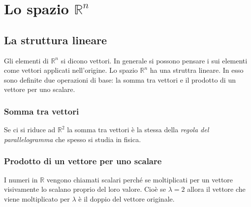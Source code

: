 \section{Lo spazio $\mathbb{R}^n$}
\subsection{La struttura lineare}
Gli elementi di $\mathbb{R}^n$ si dicono vettori. In generale si possono pensare i sui elementi come vettori applicati nell'origine. Lo spazio $\mathbb{R}^n$ ha una struttra lineare. In esso sono definite due operazioni di base: la somma tra vettori e il prodotto di un vettore per uno scalare.

\subsubsection{Somma tra vettori}

Se ci si riduce ad $\mathbb{R}^2$ la somma tra vettori è la stessa della \textit{regola del parallelogramma} che spesso si studia in fisica.

\subsubsection{Prodotto di un vettore per uno scalare}
I numeri in $\mathbb{R}$ vengono chiamati scalari perché se moltiplicati per un vettore visivamente lo scalano proprio del loro valore. Cioè se $\lambda = 2$ allora il vettore che viene moltiplicato per $\lambda$ è il doppio del vettore originale.

